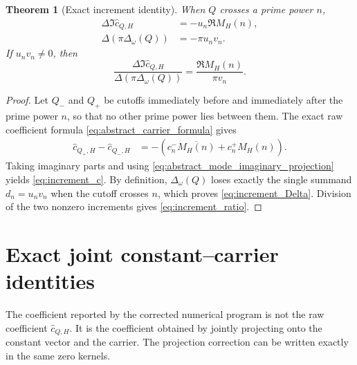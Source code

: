 \documentclass[11pt]{amsart}
\numberwithin{equation}{section}
\theoremstyle{plain}
\newtheorem{theorem}{Theorem}[section]
\theoremstyle{definition}
\theoremstyle{remark}
\newcommand{\1}{\mathbf{1}}
\begin{document}
\begin{theorem}[Exact increment identity]
\label{thm:increment_identity}
When \(Q\) crosses a prime power \(n\),
\begin{align}
\Delta\Im\widehat c_{Q,H}
&=
-u_n\Re M_H(n),
\label{eq:increment_c}
\\
\Delta\left(\pi\Delta_\omega(Q)\right)
&=
-\pi u_nv_n.
\label{eq:increment_Delta}
\end{align}
If \(u_nv_n\neq0\), then
\begin{equation}
\boxed{
\frac{
\Delta\Im\widehat c_{Q,H}
}{
\Delta(\pi\Delta_\omega(Q))
}
=
\frac{\Re M_H(n)}{\pi v_n}.
}
\label{eq:increment_ratio}
\end{equation}
\end{theorem}

\begin{proof}
Let \(Q_-\) and \(Q_+\) be cutoffs immediately before and immediately
after the prime power \(n\), so that no other prime power lies between
them.  The exact raw coefficient formula
\eqref{eq:abstract_carrier_formula} gives
\begin{align}
\widehat c_{Q_+,H}-\widehat c_{Q_-,H}
&=
-\left(
c_n^-\overline{M_H(n)}+c_n^+M_H(n)
\right).
\label{eq:increment_raw_complex}
\end{align}
Taking imaginary parts and using
\eqref{eq:abstract_mode_imaginary_projection} yields
\eqref{eq:increment_c}.  By definition,
\(\Delta_\omega(Q)\) loses exactly the single summand
\(d_n=u_nv_n\) when the cutoff crosses \(n\), which proves
\eqref{eq:increment_Delta}.  Division of the two nonzero increments gives
\eqref{eq:increment_ratio}.
\end{proof}


\section{Exact joint constant--carrier identities}
\label{sec:exact_joint_carrier_identities}

The coefficient reported by the corrected numerical program is not the
raw coefficient \(\widehat c_{Q,H}\).  It is the coefficient obtained by
jointly projecting onto the constant vector and the carrier.  The
projection correction can be written exactly in the same zero kernels.
\end{document}

